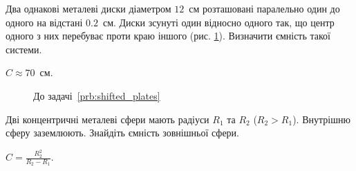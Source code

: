 \begin{problem}\label{prb:shifted_plates}
Два однакові металеві диски діаметром $12$~см розташовані паралельно один до одного на відстані $0.2$~см. Диски зсунуті один відносно одного так, що центр одного з них  перебуває проти краю іншого (рис. \ref{shifted_plates}). Визначити ємність такої системи.  
\begin{solution}
	$C \approx 70$~см.
\end{solution}
\end{problem}
\begin{figure}[h!]\centering
	\caption{До задачі~\ref{prb:shifted_plates}}
	\label{shifted_plates}
\end{figure}

%
%

\begin{problem}
    Дві концентричні металеві сфери мають радіуси $R_1$ та $R_2$ ($ R_2  > R_1 $). Внутрішню сферу заземлюють. Знайдіть ємність зовнішньої сфери.
\begin{solution}
	$C = \frac{R_2^2}{R_2 - R_1}$.
\end{solution}
\end{problem}

